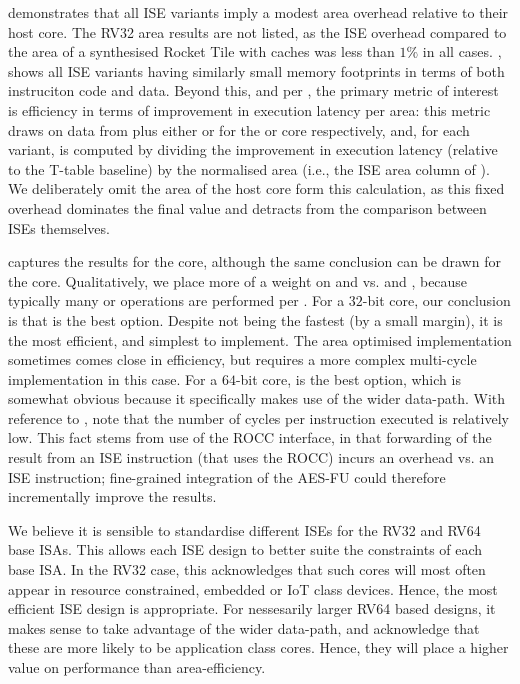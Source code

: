 
demonstrates that all ISE variants
imply a modest area overhead relative to their host core.
The RV32  area results are not listed, as the ISE overhead compared to
the area of a synthesised Rocket Tile with caches was less than $1\%$ in all
cases.
,
shows all ISE variants
having similarly small memory footprints in terms of both instruciton code and
data.
Beyond this, and per 
,
the primary metric of interest is efficiency in terms of
improvement in execution latency per area:
this metric draws on data from
plus either
or
for the  or  core respectively,
and, for each variant, is computed by dividing the improvement in execution 
latency (relative to the T-table baseline) by the normalised area (i.e., the 
ISE area column of ). We deliberately omit the area of
the host core form this calculation, as this fixed overhead dominates the
final value and detracts from the comparison between ISEs themselves.

captures the results for the  core, although the same conclusion can 
be drawn for the  core.  Qualitatively, we place more of a weight on 
and 
vs.
and 
,
because
typically many  or  operations are performed per
.
For a $32$-bit core, our conclusion is that
is the best option.
Despite not being the fastest (by a small margin), it is the most efficient,
and simplest to implement.
The area optimised  implementation sometimes comes close in
efficiency, but requires a more complex multi-cycle implementation
in this case.
For a $64$-bit core,
is the best option, which is somewhat obvious because it specifically makes
use of the wider data-path.
With reference to
, 
note that the number of cycles per instruction executed is relatively low.
This fact stems from use of the ROCC interface, in that forwarding of the 
result from an ISE instruction (that uses the ROCC) incurs an overhead vs. 
an ISE instruction; fine-grained integration of the AES-FU could therefore
incrementally improve the results.

We believe it is sensible to standardise different ISEs for the
RV32 and RV64 base ISAs.
This allows each ISE design to better suite the constraints of each
base ISA.
In the RV32 case, this acknowledges that such cores will most often
appear in resource constrained, embedded or IoT class devices.
Hence, the most efficient ISE design is appropriate.
For nessesarily larger RV64 based designs, it makes sense to take advantage
of the wider data-path, and acknowledge that these are more likely to
be application class cores. Hence, they will place a higher value
on performance than area-efficiency.

